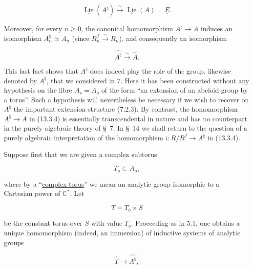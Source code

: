 \begin{equation}\tag{13.3.5}
 \underline{\operatorname{Lie}}(A^\natural)
 \stackrel{\sim}{\longrightarrow}
 \underline{\operatorname{Lie}}(A)=\underline E.
\end{equation}

\noindent
Moreover, for every $n\geqslant0$, the canonical homomorphism
$A^\natural\longrightarrow A$ induces an isomorphism
$A_n^\natural\simeq A_n$ (since $R_n^f\stackrel{\sim}{\longrightarrow}
R_n$), and consequently an isomorphism

\begin{equation}\tag{13.3.6}
 \widehat{A^\natural}\stackrel{\sim}{\longrightarrow}\widehat A.
\end{equation}

\noindent
This last fact shows that $A^\natural$ does indeed play the role of the
group, likewise denoted by $A^\natural$, that we considered in 7. Here
it has been constructed without any hypothesis on the fibre
$A_s=A_o$ of the form ``an extension of an abeloid group by a torus''.
Such a hypothesis will nevertheless be necessary if we wish to recover
on $A^\natural$ the important extension structure (7.2.3). By contrast,
the homomorphism $A^\natural\longrightarrow A$ in (13.3.4) is essentially
transcendental in nature and has no counterpart in the purely algebraic
theory of \S~7. In \S~14 we shall return to the question of a purely
algebraic interpretation of the homomorphism
$i:R/R^f\longrightarrow A^\natural$ in (13.3.4).

Suppose first that we are given a complex subtorus

\begin{equation}\tag{13.3.7}
 T_o\subset A_o,
\end{equation}

\noindent
where by a ``\underline{complex torus}'' we mean an analytic group
isomorphic to a Cartesian power of $\mathbb C^*$. Let

\begin{equation}\tag{13.3.8}
 T=T_o\times S
\end{equation}

\noindent
be the constant torus over $S$ with value $T_o$. Proceeding as in 5.1,
one obtains a unique homomorphism (indeed, an immersion) of inductive
systems of analytic groups

\begin{equation*}
 \widehat T\longrightarrow\widehat{A^\natural},
\end{equation*}

